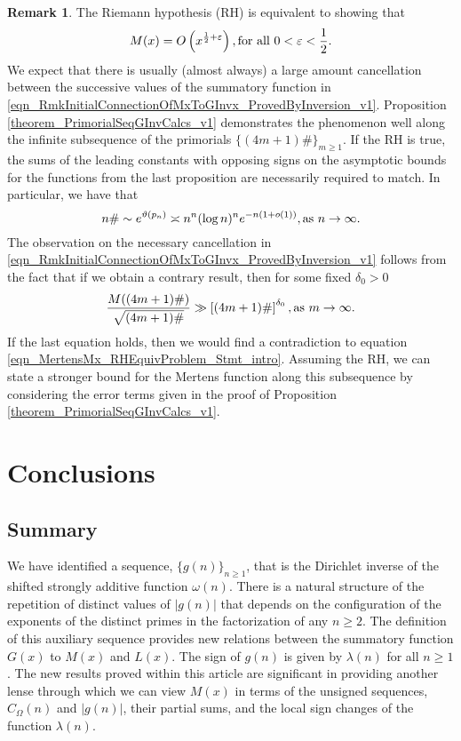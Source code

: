 \documentclass[11pt,reqno,a4letter]{article}
\newcommand{\hlocalref}[1]{\hyperref[#1]{\ref{#1}}}
\numberwithin{equation}{section}
\numberwithin{figure}{section}
\numberwithin{table}{section}
\theoremstyle{plain}
\numberwithin{theorem}{section}
\theoremstyle{definition}
\newtheorem{remark}[theorem]{Remark}
\theoremstyle{remark}
\newcommand{\mathtext}[1]{\text{\rm #1}}
\begin{document}
\begin{remark}
\label{remark_LocalCancellationWithGxAlongThePrimorialsUnderTheRH} 
The Riemann hypothesis (RH) is equivalent to showing that 
\begin{equation} 
\label{eqn_MertensMx_RHEquivProblem_Stmt_intro} 
M(x) = O\left(x^{\frac{1}{2}+\varepsilon}\right), \mathtext{ for all } 0 < \varepsilon < \frac{1}{2}.
\end{equation}
We expect that there is usually (almost always) 
a large amount cancellation between the successive 
values of the summatory function in 
\eqref{eqn_RmkInitialConnectionOfMxToGInvx_ProvedByInversion_v1}. 
Proposition \hlocalref{theorem_PrimorialSeqGInvCalcs_v1} 
demonstrates the phenomenon well along the infinite 
subsequence of the primorials $\{(4m+1)\#\}_{m \geq 1}$. 
If the RH is true, the sums of the leading constants with opposing signs 
on the asymptotic bounds for the functions from the last proposition 
are necessarily required to match. 
In particular, we have that 
\cite{DUSART-1999,DUSART-2010} 
\[
n\# \sim e^{\vartheta(p_n)} \asymp n^n (\log n)^n e^{-n(1+o(1))}, 
     \mathtext{ as } n \rightarrow \infty. 
\]
The observation on the necessary cancellation in 
\eqref{eqn_RmkInitialConnectionOfMxToGInvx_ProvedByInversion_v1}
follows from the fact that if we obtain a contrary result, 
then for some fixed $\delta_0 > 0$
\[
\frac{M((4m+1)\#)}{\sqrt{(4m+1)\#}} \gg \left[(4m+1)\#\right]^{\delta_0}, 
     \mathtext{ as } m \rightarrow \infty. 
\]
If the last equation holds, then we would find a contradiction to 
equation \eqref{eqn_MertensMx_RHEquivProblem_Stmt_intro}. 
Assuming the RH, we can state a stronger bound for the 
Mertens function along this subsequence by considering the 
error terms given in the proof of 
Proposition \hlocalref{theorem_PrimorialSeqGInvCalcs_v1}. 
\end{remark}

\section{Conclusions}

\subsection{Summary}

We have identified a sequence, 
$\{g(n)\}_{n \geq 1}$, that is the Dirichlet inverse of the 
shifted strongly additive function $\omega(n)$. 
There is a natural structure of the repetition of distinct values 
of $|g(n)|$ that depends on the configuration of the 
exponents of the distinct primes in the factorization of any $n \geq 2$. 
The definition of this auxiliary sequence provides new relations between the 
summatory function $G(x)$ to $M(x)$ and $L(x)$. 
The sign of $g(n)$ is given by $\lambda(n)$ for all $n \geq 1$. 
The new results proved within this article 
are significant in providing another lense through which we can view $M(x)$ 
in terms of the unsigned sequences, $C_{\Omega}(n)$ and $|g(n)|$, 
their partial sums, and the local sign changes of the function $\lambda(n)$. 
\end{document}
